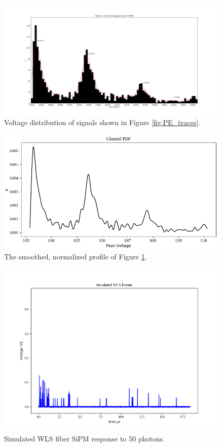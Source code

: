 \documentclass[11pt]{article}
\begin{document}
	\begin{figure}
		\centering
		\includegraphics[width=1.0\linewidth]{1200_channel3_PEs_hist_diff}
		\caption{Voltage distribution of signals shown in Figure \ref{fig:PE_traces}.}
		\label{fig:PE_traces_hist}
	\end{figure}

	\begin{figure}
		\centering
		\includegraphics[width=1.0\linewidth]{1200_channel3_PEs_PDF}
		\caption{The smoothed, normalized profile of Figure \ref{fig:PE_traces_hist}.}
		\label{fig:PE_traces_PDF}
	\end{figure}

	\begin{figure}
		\centering
		\includegraphics[width=1.0\linewidth]{example_trace}
		\caption{Simulated WLS fiber SiPM response to 50 photons.}
		\label{fig:example_trace}
	\end{figure}
\end{document}
